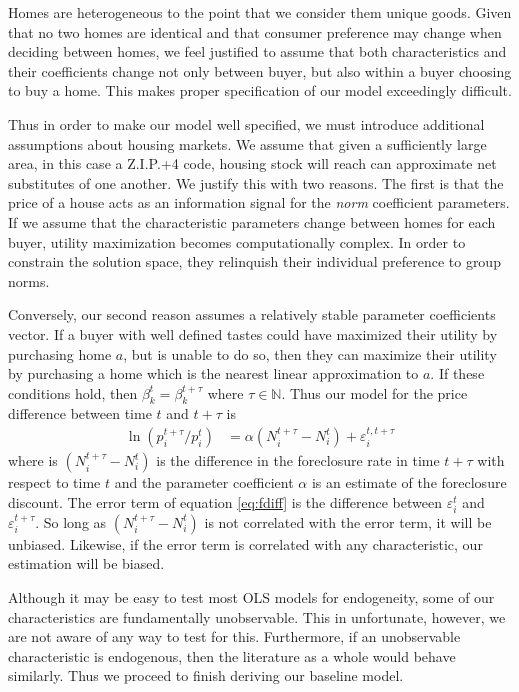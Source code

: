 \documentclass[12pt,oneside]{amsbook}
\newcommand{\eps}{\varepsilon^t_i}
\newcommand{\bet}{\beta^t}
\newcommand{\dos}{{t + \tau}}
\newcommand{\deps}{\varepsilon^\dos_i}
\newcommand{\teps}{\varepsilon^{t,\dos}_i}
\begin{document}
Homes are heterogeneous to the point that we consider them unique goods. Given that no two homes are identical and that consumer preference may change when deciding between homes, we feel justified to assume that both characteristics and their coefficients change not only between buyer, but also within a buyer choosing to buy a home. This makes proper specification of our model exceedingly difficult. 

Thus in order to make our model well specified, we must introduce additional assumptions about housing markets. We assume that given a sufficiently large area, in this case a Z.I.P.+4 code, housing stock will reach can approximate net substitutes of one another. We justify this with two reasons. The first is that the price of a house acts as an information signal for the \textit{norm} coefficient parameters. If we assume that the characteristic parameters change between homes for each buyer, utility maximization becomes computationally complex. In order to constrain the solution space, they relinquish their individual preference to group norms. 

Conversely, our second reason assumes a relatively stable parameter coefficients vector. If a buyer with well defined tastes could have maximized their utility by purchasing home $a$, but is unable to do so, then they can maximize their utility by purchasing a home which is the nearest linear approximation to $a$. If these conditions hold, then $\bet_k = \beta_k^{t+\tau}$ where $\tau \in \mathbb{N}$. Thus our model for the price difference between time $t$ and $\dos$ is
\begin{align}
\ln (p^\dos_i /p^t_{i}  ) & =  \alpha ( N_i^\dos - N_i^t ) + \teps \label{eq:fdiff}
\end{align}
where is $( N_i^\dos - N_i^t )$ is the difference in the foreclosure rate in time $\dos$ with respect to time $t$ and the parameter coefficient $\alpha$ is an estimate of the foreclosure discount. The error term of equation \ref{eq:fdiff} is the difference between $\eps$ and $\deps$. So long as $( N_i^\dos - N_i^t )$ is not correlated with the error term, it will be unbiased. Likewise, if the error term is correlated with any characteristic, our estimation will be biased. 

Although it may be easy to test most OLS models for endogeneity, some of our characteristics are fundamentally unobservable. This in unfortunate, however, we are not aware of any way to test for this. Furthermore, if an unobservable characteristic is endogenous, then the literature as a whole would behave similarly. Thus we proceed to finish deriving our baseline model. 
\end{document}

